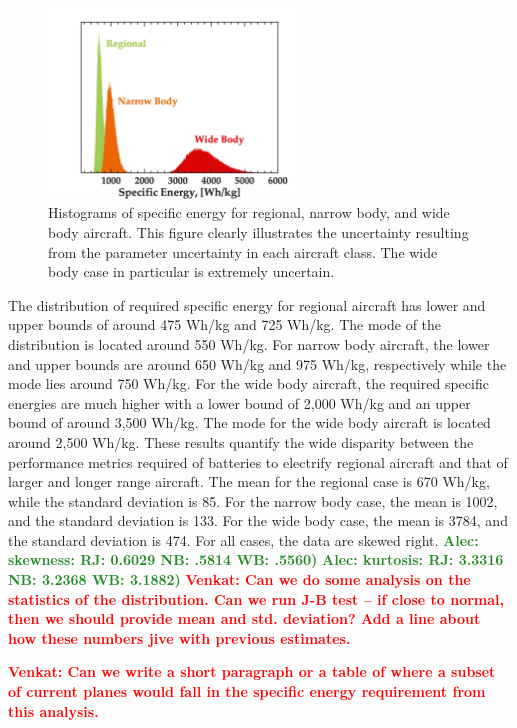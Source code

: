 \documentclass{achemso}
\newcommand{\vv}[1]{{\textbf{\textcolor{red}{Venkat: #1}}}}
\newcommand{\ab}[1]{{\textbf{\textcolor{ForestGreen}{Alec: #1}}}}
\begin{document}
\begin{figure}[htp]
\centering

\includegraphics[width=0.6\textwidth]{Figures/histograms.png}

\caption{Histograms of specific energy for regional, narrow body, and wide body aircraft. This figure clearly illustrates the uncertainty resulting from the parameter uncertainty in each aircraft class. The wide body case in particular is extremely uncertain.}
\label{fig:histograms}

\end{figure}

The distribution of required specific energy for regional aircraft has lower and upper bounds of around 475 Wh/kg and 725 Wh/kg. The mode of the distribution is located around 550 Wh/kg. For narrow body aircraft, the lower and upper bounds are around 650 Wh/kg and 975 Wh/kg, respectively while the mode lies around 750 Wh/kg. For the wide body aircraft, the required specific energies are much higher with a lower bound of 2,000 Wh/kg and an upper bound of around 3,500 Wh/kg. The mode for the wide body aircraft is located around 2,500 Wh/kg. These results quantify the wide disparity between the performance metrics required of batteries to electrify regional aircraft and that of larger and longer range aircraft. The mean for the regional case is 670 Wh/kg, while the standard deviation is 85. For the narrow body case, the mean is 1002, and the standard deviation is 133. For the wide body case, the mean is 3784, and the standard deviation is 474. For all cases, the data are skewed right.  
\ab{skewness: RJ: 0.6029 NB: .5814 WB: .5560)}
\ab{kurtosis: RJ: 3.3316 NB: 3.2368 WB: 3.1882)}
\vv{Can we do some analysis on the statistics of the distribution.  Can we run J-B test -- if close to normal, then we should provide mean and std. deviation?  Add a line about how these numbers jive with previous estimates.}    

\vv{Can we write a short paragraph or a table of where a subset of current planes would fall in the specific energy requirement from this analysis.}
\end{document}
